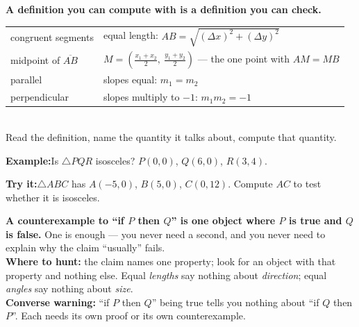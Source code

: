 \documentclass[12pt]{article}
\begin{document}


\begin{formulabox}
\textbf{A definition you can compute with is a definition you can check.}\\[3pt]
\begin{tabular}{@{}p{4.0cm}@{}p{9.3cm}@{}}
congruent segments & equal length: $AB = \sqrt{(\Delta x)^2 + (\Delta y)^2}$\\
midpoint of $\overline{AB}$ & $M = \left(\frac{x_1+x_2}{2},\ \frac{y_1+y_2}{2}\right)$ --- the one point with $AM = MB$\\
parallel & slopes equal: $m_1 = m_2$\\
perpendicular & slopes multiply to $-1$: $m_1 m_2 = -1$\\
\end{tabular}\\[3pt]
Read the definition, name the quantity it talks about, compute that quantity.
\end{formulabox}

\begin{examplebox}
\textbf{Example:}\quad Is $\triangle PQR$ isosceles? $P(0,0)$, $Q(6,0)$, $R(3,4)$.
\end{examplebox}

\begin{tryitbox}
\textbf{Try it:}\quad $\triangle ABC$ has $A(-5,0)$, $B(5,0)$, $C(0,12)$. Compute
$AC$ to test whether it is isosceles.\\[2pt]
\end{tryitbox}


\begin{formulabox}
\textbf{A counterexample to ``if $P$ then $Q$'' is one object where $P$ is true
and $Q$ is false.} One is enough --- you never need a second, and you never need
to explain why the claim ``usually'' fails.\\[3pt]
\textbf{Where to hunt:} the claim names one property; look for an object with
that property and nothing else. Equal \emph{lengths} say nothing about
\emph{direction}; equal \emph{angles} say nothing about \emph{size}.\\[2pt]
\textbf{Converse warning:} ``if $P$ then $Q$'' being true tells you nothing about
``if $Q$ then $P$''. Each needs its own proof or its own counterexample.
\end{formulabox}
\end{document}
